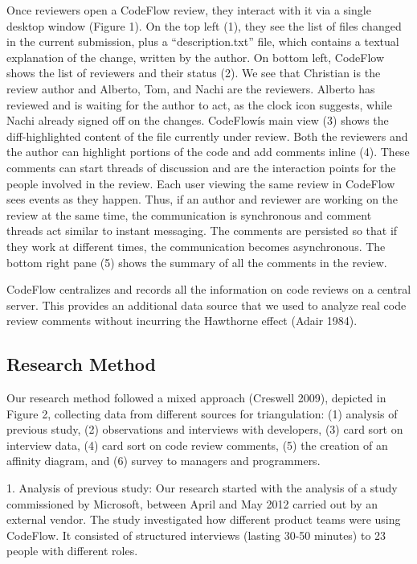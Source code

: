 Once reviewers open a CodeFlow review, they interact with it via a single
desktop window (Figure 1). On the top left (1), they see the list of files
changed in the current submission, plus a ``description.txt'' file, which
contains a textual explanation of the change, written by the author. On bottom
left, CodeFlow shows the list of reviewers and their status (2). We see that
Christian is the review author and Alberto, Tom, and Nachi are the reviewers.
Alberto has reviewed and is waiting for the author to act, as the clock icon
suggests, while Nachi already signed off on the changes. CodeFlowís main view
(3) shows the diff-highlighted content of the file currently under review. Both
the reviewers and the author can highlight portions of the code and add
comments inline (4). These comments can start threads of discussion and are the
interaction points for the people involved in the review. Each user viewing the
same review in CodeFlow sees events as they happen.  Thus, if an author and
reviewer are working on the review at the same time, the communication is
synchronous and comment threads act similar to instant messaging. The comments
are persisted so that if they work at different times, the communication
becomes asynchronous. The bottom right pane (5) shows the summary of all the
comments in the review. 

CodeFlow centralizes and records all the information on code reviews on a
central server. This provides an additional data source that we used to analyze
real code review comments without incurring the Hawthorne effect (Adair 1984).

\subsection{Research Method}

Our research method followed a mixed approach (Creswell 2009), depicted in
Figure 2, collecting data from different sources for triangulation: (1)
analysis of previous study, (2) observations and interviews with developers,
(3) card sort on interview data,  (4) card sort on code review comments, (5)
the creation of an affinity diagram, and (6) survey to managers and
programmers.

1. Analysis of previous study: Our research started with the analysis of a
study commissioned by Microsoft, between April and May 2012 carried out by an
external vendor. The study investigated how different product teams were using
CodeFlow. It consisted of structured interviews (lasting 30-50 minutes) to 23
people with different roles.

